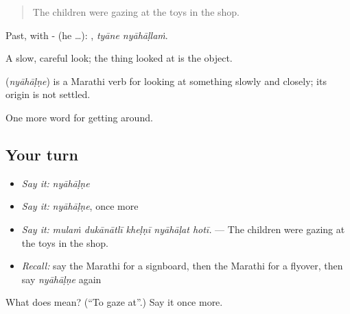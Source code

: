 \begin{quote}
The children were gazing at the toys in the shop.
\end{quote}

Past, with - (he …):  , \emph{tyāne nyāhāḷlaṁ}.

A slow, careful look; the thing looked at is the object.

\begin{cousinweb}
\textbf{} (\emph{nyāhāḷṇe}) is a Marathi verb for looking at something slowly and closely; its origin is not settled.
\end{cousinweb}

\begin{grammarlens}[title={What you've built}]
One more word for getting around.
\end{grammarlens}

\subsection*{Your turn}
\begin{itemize}
\raggedright
  \item \emph{Say it:} \emph{nyāhāḷṇe}
  \item \emph{Say it:} \emph{nyāhāḷṇe}, once more
  \item \emph{Say it:} \emph{mulaṁ dukānātlī kheḷṇī nyāhāḷat hotī.} — The children were gazing at the toys in the shop.
  \item \emph{Recall:} say the Marathi for a signboard, then the Marathi for a flyover, then say \emph{nyāhāḷṇe} again
\end{itemize}

\begin{tcolorbox}[breakable,colback=teal!4,colframe=teal!35!black,title={Before you move on}]
What does  mean? (\textquotedblleft{}To gaze at\textquotedblright{}.) Say it once more.
\end{tcolorbox}
